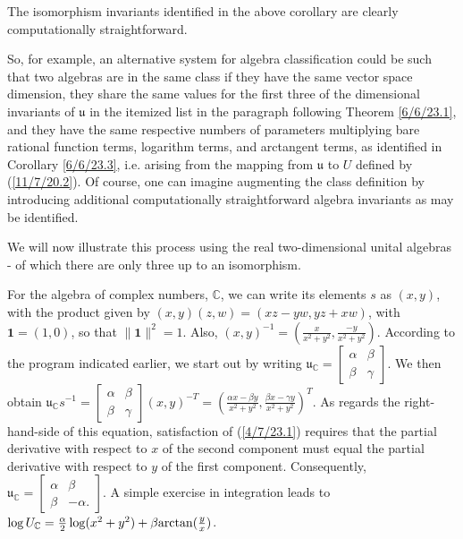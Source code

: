\documentclass{amsart}
\numberwithin{equation}{section}
\theoremstyle{definition}
\numberwithin{theorem}{section}
\begin{document}
The isomorphism invariants identified in the above corollary are clearly computationally straightforward.

So, for example, an alternative system for algebra classification could be such that two algebras are in the same class if they have the same vector space dimension, they share the same values for the first three of the dimensional invariants of $\mathfrak{u}$ in the itemized list in the paragraph following Theorem \ref{6/6/23.1}, and they have the same respective numbers of parameters multiplying bare rational function terms, logarithm terms, and arctangent terms, as identified in Corollary \ref{6/6/23.3}, i.e. arising from the mapping from $\mathfrak{u}$ to $ U$ defined by (\ref{11/7/20.2}).  
Of course, one can imagine augmenting the class definition by introducing additional computationally straightforward algebra invariants as may be identified.  

We will now illustrate this process using the real two-dimensional unital algebras - of which there are only three up to an isomorphism.

For the algebra of complex numbers, $\mathbb{C}$, we can write its elements $s$ as $(x,y)$, with the product given by $(x,y)(z,w) = (xz-yw, yz+xw)$, with $\mathbf{1}=(1,0)$, so that $\|\mathbf{1}\|^2=1$.  Also, $(x,y)^{-1} = (\frac{x}{x^2+y^2},\frac{-y}{x^2+y^2})$.  According to the program indicated earlier, we start out by writing  $\mathfrak{u}_\mathbb{C} = \left[\begin{array}{ccc}
 \alpha & \beta   \\ 
 \beta & \gamma    
\end{array}\right]$.  We then obtain  $\mathfrak{u}_\mathbb{C}s^{-1} = \left[\begin{array}{ccc}
 \alpha & \beta   \\ 
 \beta & \gamma    
\end{array}\right](x,y)^{-T} = \left(\frac{\alpha x - \beta y}{x^2+y^2}, \frac{\beta x - \gamma y}{x^2+y^2}\right)^T$.  As regards the right-hand-side of this equation, satisfaction of (\ref{4/7/23.1}) requires that the partial derivative with respect to $x$ of the second component must equal the partial derivative with respect to $y$ of the first component.  Consequently, $\mathfrak{u}_{\mathbb{C}} = \left[\begin{array}{ccc}
 \alpha & \beta   \\ 
 \beta & -\alpha.    
\end{array}\right]$.  A simple exercise in integration leads to $\log  U_{\mathbb{C}} = \frac{\alpha}{2}\log(x^2+y^2) + \beta{\rm arctan}(\frac{y}{x})$.
\end{document}
